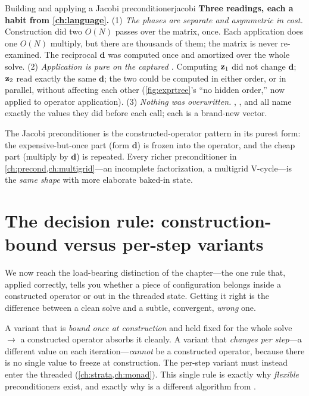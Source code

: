 \begin{workedexample}{Building and applying a Jacobi preconditioner}{jacobi}
\textbf{Three readings, each a habit from \cref{ch:language}.} (1) \emph{The phases
are separate and asymmetric in cost.} Construction did two $O(N)$ passes over the
matrix, once. Each application does one $O(N)$ multiply, but there are thousands of
them; the matrix is never re-examined. The reciprocal $\mathbf{d}$ was computed once and
amortized over the whole solve. (2) \emph{Application is pure on the captured
.} Computing $\mathbf{z}_1$ did not change $\mathbf{d}$; $\mathbf{z}_2$ read exactly the same
$\mathbf{d}$; the two could be computed in either order, or in parallel, without affecting
each other (\cref{fig:exprtree}'s ``no hidden order,'' now applied to operator
application). (3) \emph{Nothing was overwritten.} , , and 
all name exactly the values they did before each call; each  is a brand-new
vector.

The Jacobi preconditioner is the constructed-operator pattern in its purest form: the
expensive-but-once part (form $\mathbf{d}$) is frozen into the operator, and the cheap part
(multiply by $\mathbf{d}$) is repeated. Every richer preconditioner in
\cref{ch:precond,ch:multigrid}---an incomplete factorization, a multigrid V-cycle---is
the \emph{same shape} with more elaborate baked-in state.
\end{workedexample}

\section{The decision rule: construction-bound versus per-step variants}
\label{sec:decisionrule}

We now reach the load-bearing distinction of the chapter---the one rule that, applied
correctly, tells you whether a piece of configuration belongs inside a constructed
operator or out in the threaded state. Getting it right is the difference between a
clean solve and a subtle, convergent, \emph{wrong} one.

\begin{keyidea}
A variant that is \emph{bound once at construction} and held fixed for the whole
solve $\to$ a constructed operator absorbs it cleanly. A variant that \emph{changes
per step}---a different value on each iteration---\emph{cannot} be a constructed
operator, because there is no single value to freeze at construction. The per-step
variant must instead enter the threaded  (\cref{ch:strata,ch:monad}).
This single rule is exactly why \emph{flexible} preconditioners exist, and exactly
why  is a different algorithm from .
\end{keyidea}

